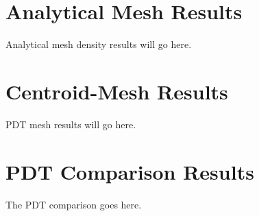 

\FloatBarrier
\section{Analytical Mesh Results}
Analytical mesh density results will go here.

\section{Centroid-Mesh Results}

PDT mesh results will go here.

\section{PDT Comparison Results}

The PDT comparison goes here.
